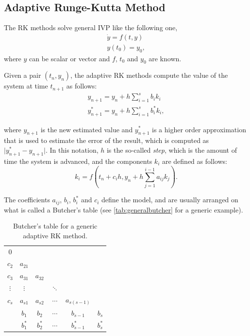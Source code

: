 \subsection{Adaptive Runge-Kutta Method}

The \ac{RK} methods solve general \ac{IVP} like the following one,
\begin{align*}
	\dot{y} = f(t,y) \\
	y(t_0) = y_0,
\end{align*}
where $y$ can be scalar or vector and $f$, $t_0$ and $y_0$ are known.

Given a pair $(t_n, y_n)$, the adaptive \ac{RK} methods compute the value of the system at time $t_{n+1}$ as follows:
\begin{align*}
	y_{n+1} = y_n + h \sum_{i=1}^s b_i k_i\\
	y^*_{n+1} = y_n + h \sum_{i=1}^s b^*_i k_i,
\end{align*}

where $y_{n+1}$ is the new estimated value and $y^*_{n+1}$ is a higher order approximation that is used to estimate the error of the result, which is computed as $\vert y^*_{n+1} - y_{n+1} \vert$. In this notation, $h$ is the so-called \emph{step}, which is the amount of time the system is advanced, and the components $k_i$ are defined as follows:
\[
	k_i = f(t_n + c_ih, y_n + h\sum_{j=1}^{i-1} a_{ij} k_j).
\]

The coefficients $a_{ij}$, $b_i$, $b_i^*$ and $c_i$ define the model, and are usually arranged on what is called a Butcher's table (see \autoref{tab:generalbutcher} for a generic example).

\begin{table}[bth]
	\myfloatalign
	\begin{tabularx}{.54\textwidth}{c|ccccc}
		$0$&  & & & & \\
		$c_2$& $a_{21}$ & & & & \\
		$c_3$& $a_{31}$ & $a_{32}$ & & & \\
		$\vdots$& $\vdots$ &  & $\ddots$ & & \\
		$c_s$& $a_{s1}$  & $a_{s2}$ & $\cdots$ & $a_{s(s-1)}$ & \\ \hline
		& $b_1$ & $b_2$ & $\cdots$ & $b_{s-1}$ & $b_s$ \\ \hline
		& $b^*_1$ & $b^*_2$ & $\cdots$ & $b^*_{s-1}$ & $b^*_s$ \\
	\end{tabularx}
	\caption[Butcher's table for an adaptive \ac{RK} method]{Butcher's table for a generic adaptive \ac{RK} method.}
	\label{tab:generalbutcher}
\end{table}

